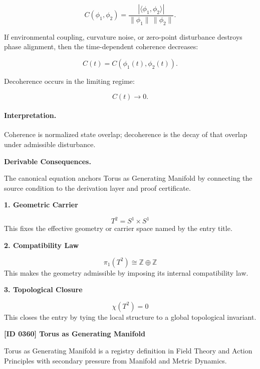 \begin{equation}
C(\phi_1,\phi_2)
=
\frac{
|\langle \phi_1,\phi_2\rangle|
}{
\|\phi_1\|\,\|\phi_2\|
}.
\end{equation}

If environmental coupling, curvature noise, or zero-point disturbance destroys phase alignment, then the time-dependent coherence decreases:

\begin{equation}
C(t)
=
C(\phi_1(t),\phi_2(t)).
\end{equation}

Decoherence occurs in the limiting regime:

\begin{equation}
\boxed{
C(t)\rightarrow 0 .
}
\end{equation}

\paragraph{Interpretation.}
Coherence is normalized state overlap; decoherence is the decay of that overlap under admissible disturbance.

\par\vspace{0.35em}
\noindent\textbf{Derivable Consequences.}\quad
\begingroup
\footnotesize
\raggedright
The canonical equation anchors Torus as Generating Manifold by connecting the source condition to the derivation layer and proof certificate.
\par\endgroup

\noindent\textbf{1. Geometric Carrier}\par
\[
T^{2}=S^{1}\times S^{1}
\]
\noindent This fixes the effective geometry or carrier space named by the entry title.\par
\noindent\textbf{2. Compatibility Law}\par
\[
\pi_{1}(T^{2})\cong\mathbb{Z}\oplus\mathbb{Z}
\]
\noindent This makes the geometry admissible by imposing its internal compatibility law.\par
\noindent\textbf{3. Topological Closure}\par
\[
\chi(T^{2})=0
\]
\noindent This closes the entry by tying the local structure to a global topological invariant.\par

\clearpage
\noindent\textbf{[ID 0360] Torus as Generating Manifold}\par
\vspace{0.35em}
\begingroup\small
{}
Torus as Generating Manifold is a registry definition in Field Theory and Action Principles with secondary pressure from Manifold and Metric Dynamics.

